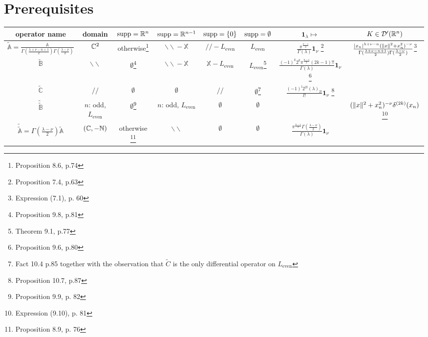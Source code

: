 \documentclass[12pt]{article} %
\renewcommand{\setminus}{\ensuremath{{}-{}}}
\newcommand{\Le}{L_{\mbox{even}}}
\newcommand{\on}{\mathbf{1}_\nu}
\begin{document}
\section{Prerequisites}
\begin{adjustwidth}{-4cm}{}
{\scriptsize
\def\arraystretch{3.0}
\begin{tabu}{ |c | c | c | c |c |c |c|c|}
	\hline
		operator name &
		domain &
		$\operatorname{supp}=\mathbb{R}^n$ &
		$\operatorname{supp}=\mathbb{R}^{n-1}$ &
		$\operatorname{supp}=\left\{0\right\}$ &
		$\operatorname{supp}=\emptyset$ &
		$\mathbf{1}_\lambda\mapsto$ &
		$K\in\mathcal{D}'(\mathbb{R}^n)$
	\\\hline
		$\tilde{\mathbb{A}}=\frac{\mathbb{A}}{\Gamma(\frac{\lambda+\nu-n+1}{2})\Gamma(\frac{\lambda-\nu}{2})}$ &
		$\mathbb{C}^2$ &
		otherwise\footnote[1]{Proposition 8.6, p.74} &
		$\backslash\backslash\setminus\mathbb{X}$\footnotemark[1]&
		$//\setminus L_{\mbox{even}}$ \footnotemark[1]& 
		$L_{\mbox{even}}$\footnotemark[1] &
		$\frac{\pi^{\frac{n-1}{2}}}{\Gamma(\lambda)}\on$ \footnote[9]{Proposition 7.4, p.63}&
		$\frac{\left|x_n\right|^{\lambda+\nu-n}(\|x\|^2+x_n^2)^{-\nu}}
			{\Gamma(\frac{\lambda+\nu-n+1}{2})\Gamma(\frac{\lambda-\nu}{2})}$\footnote[10]{Expression (7.1), 
			p. 60}
	\\\hline
		$\tilde{\mathbb{B}}$ &
		$\backslash\backslash$ &
		$\emptyset$\footnote[2]{Proposition 9.8, p.81} &
		$\backslash\backslash\setminus\mathbb{X}$\footnotemark[2] &
		$\mathbb{X}\setminus L_{\mbox{even}}$\footnotemark[2]&
		$L_{\mbox{even}}$\footnote[7]{Theorem 9.1, p.77}&
		$\frac{(-1)^k2^k\pi^{\frac{n-1}{2}}(2k-1)!!}{\Gamma(\lambda)}\on$  \footnote[5]{Proposition 9.6, p.80}&
	\\\hline
		$\tilde{\mathbb{C}}$ &
		$//$ &
		$\emptyset$ &
		$\emptyset$ &
		$//$ &
		$\emptyset$\footnote[3]{Fact
			10.4 p.85 together with the observation that $\tilde{C}$ is the only differential operator on $\Le$}&
		$\frac{(-1)^l2^{2l}(\lambda)_{2l}}{l!}\on$ \footnote[8]{Proposition 10.7, p.87}&

	\\\hline
		$\tilde{\tilde{\mathbb{B}}}$ &
		$n$: odd, $\Le$ &
		$\emptyset$\footnote[4]{Proposition 9.9, p. 82} &
		$n$: odd, $\Le$ \footnotemark[4] &
		$\emptyset$\footnotemark[4] &
		$\emptyset$\footnotemark[4]&
		&
		$(\|x\|^2+x_n^2)^{-\nu}\delta^{(2k)}(x_n)$\footnote[11]{Expression (9.10), p. 81}
	\\\hline
		$\tilde{\tilde{\mathbb{A}}}={\Gamma(\frac{\lambda-\nu}{2})}{\tilde{\mathbb{A}}}$&
		$(\mathbb{C},-\mathbb{N})$ &
		otherwise \footnote[6]{Proposition 8.9, p. 76} &
		$\backslash\backslash$\footnotemark[6]&
		$\emptyset$\footnotemark[6] &
		$\emptyset$\footnotemark[6]&
		$\frac{\pi^{\frac{n-1}{2}}\Gamma(\frac{\lambda-\nu}{2})}{\Gamma(\lambda)}\on$&
\\
		\hline
\end{tabu}
}
\end{adjustwidth}
\end{document}
